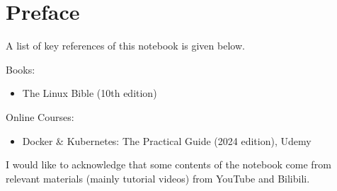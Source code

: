 \chapter*{Preface}

A list of key references of this notebook is given below.

\noindent Books:
\begin{itemize}
	\item The Linux Bible (10th edition)
\end{itemize}

\noindent Online Courses:
\begin{itemize}
	\item Docker \& Kubernetes: The Practical Guide (2024 edition), Udemy
\end{itemize}

I would like to acknowledge that some contents of the notebook come from relevant materials (mainly tutorial videos) from YouTube and Bilibili.